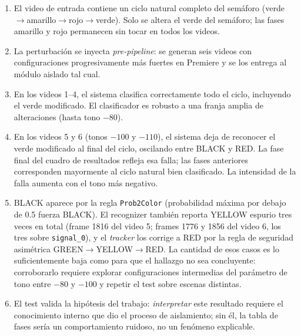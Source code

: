 \begin{enumerate}
    \item El video de entrada contiene un ciclo natural completo del semáforo (verde$\to$amarillo$\to$rojo$\to$verde). Solo se altera el verde del semáforo; las fases amarillo y rojo permanecen sin tocar en todos los videos.
    \item La perturbación se inyecta \textit{pre-pipeline}: se generan seis videos con configuraciones progresivamente más fuertes en Premiere y se los entrega al módulo aislado tal cual.
    \item En los videos 1--4, el sistema clasifica correctamente todo el ciclo, incluyendo el verde modificado. El clasificador es robusto a una franja amplia de alteraciones (hasta tono $-80$).
    \item En los videos 5 y 6 (tonos $-100$ y $-110$), el sistema deja de reconocer el verde modificado al final del ciclo, oscilando entre BLACK y RED. La fase final del cuadro de resultados refleja esa falla; las fases anteriores corresponden mayormente al ciclo natural bien clasificado. La intensidad de la falla aumenta con el tono más negativo.
    \item BLACK aparece por la regla \texttt{Prob2Color} (probabilidad máxima por debajo de 0.5 fuerza BLACK). El recognizer también reporta YELLOW espurio tres veces en total (frame 1816 del video 5; frames 1776 y 1856 del video 6, los tres sobre \texttt{signal\_0}), y el \textit{tracker} los corrige a RED por la regla de seguridad asimétrica GREEN$\to$YELLOW$\to$RED. La cantidad de esos casos es lo suficientemente baja como para que el hallazgo no sea concluyente: corroborarlo requiere explorar configuraciones intermedias del parámetro de tono entre $-80$ y $-100$ y repetir el test sobre escenas distintas.
    \item El test valida la hipótesis del trabajo: \textit{interpretar} este resultado requiere el conocimiento interno que dio el proceso de aislamiento; sin él, la tabla de fases sería un comportamiento ruidoso, no un fenómeno explicable.
\end{enumerate}